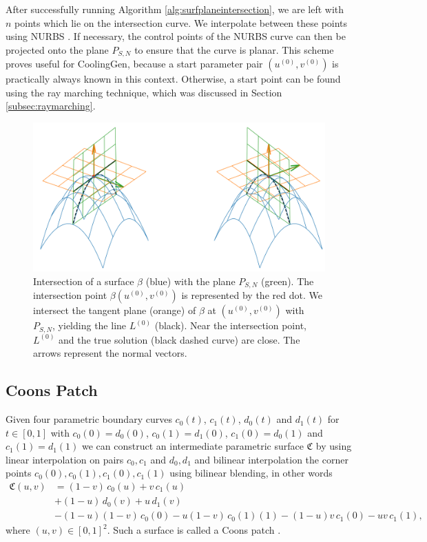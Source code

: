 \documentclass[a4paper, 11pt]{report}
\theoremstyle{definition}
\begin{document}
	After successfully running Algorithm \ref{alg:surfplaneintersection}, we are left with $n$ points which lie on the intersection curve. We interpolate between these points using NURBS \cite{Piegl1997}. If necessary, the control points of the NURBS curve can then be projected onto the plane $P_{S,N}$ to ensure that the curve is planar. This scheme proves useful for CoolingGen, because a start parameter pair $(u^{(0)}, v^{(0)})$ is practically always known in this context. Otherwise, a start point can be found using the ray marching technique, which was discussed in Section \ref{subsec:raymarching}.

	\begin{figure}[H]
		\centering
		\includegraphics[width=.8\textwidth]{../python/surfacePlaneIntersection2_cropped.png}
		\caption{Intersection of a surface $\beta$ (blue) with the plane $P_{S,N}$ (green). The intersection point $\beta(u^{(0)}, v^{(0)})$ is represented by the red dot. We intersect the tangent plane (orange) of $\beta$ at $(u^{(0)}, v^{(0)})$ with $P_{S,N}$, yielding the line $L^{(0)}$ (black). Near the intersection point, $L^{(0)}$ and the true solution (black dashed curve) are close. The arrows represent the normal vectors.}
		\label{fig:planeintersectionline}
	\end{figure}

\subsection{Coons Patch}
	Given four parametric boundary curves $c_0(t)$, $c_1(t)$, $d_0(t)$ and $d_1(t)$ for $t \in [0,1]$ with $c_0(0) = d_0(0)$, $c_0(1) = d_1(0)$, $c_1(0) = d_0(1)$ and $c_1(1) = d_1(1)$ we can construct an intermediate parametric surface $\mathfrak{C}$ by using linear interpolation on pairs $c_0, c_1$ and $d_0, d_1$ and bilinear interpolation the corner points $c_0(0), c_0(1), c_1(0), c_1(1)$ using bilinear blending, in other words
	\begin{align*}
		\mathfrak{C}(u,v) 	&= (1-v)\,c_0(u) + v\,c_1(u) \\
				&+ (1-u)\,d_0(v) + u\,d_1(v) \\
				&- (1-u)(1-v)\,c_0(0) - u(1-v)\,c_0(1)(1) - (1-u)v\,c_1(0) - uv\,c_1(1),
	\end{align*}
	where $(u,v) \in [0,1]^2$. Such a surface is called a Coons patch \cite{Coons1967}. 
\end{document}
